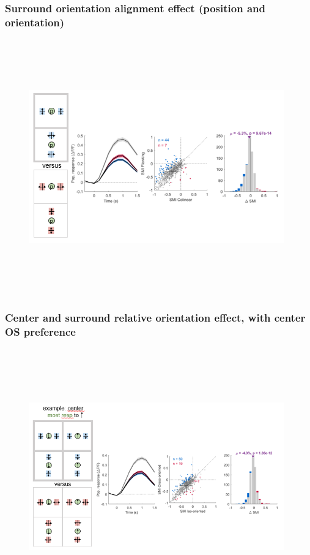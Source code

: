 \subsubsection{Surround orientation alignment effect (position and orientation)}

\begin{figure}[H] \centering \includegraphics[width=11cm,height=11cm,keepaspectratio]{Figures/7.Results/finalPopulation/sel/diagrams/7.png} 
\end{figure}

\subsubsection{Center and surround relative orientation effect, with center OS preference}

\begin{figure}[H] \centering \includegraphics[width=11cm,height=11cm,keepaspectratio]{Figures/7.Results/finalPopulation/sel/diagrams/8.png} 
\end{figure}

